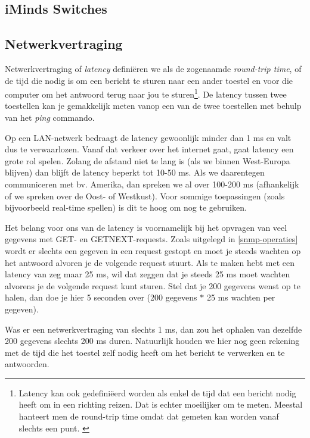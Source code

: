 \subsection{iMinds Switches}



\subsection{Netwerkvertraging}
\label{latency}

Netwerkvertraging of \textit{latency} definiëren we als de zogenaamde \textit{round-trip time},
of de tijd die nodig is om een bericht te sturen naar een ander toestel en voor die computer om het antwoord terug naar jou te sturen\footnote{
	Latency kan ook gedefiniëerd worden als enkel de tijd dat een bericht nodig heeft om in een richting reizen.
	Dat is echter moeilijker om te meten. Meestal hanteert men de round-trip time omdat dat gemeten kan worden vanaf slechts een punt. \cite{latency-wiki}
}.
De latency tussen twee toestellen kan je gemakkelijk meten vanop een van de twee toestellen met behulp van het \textit{ping} commando.

Op een LAN-netwerk bedraagt de latency gewoonlijk minder dan 1 ms en valt dus te verwaarlozen.
Vanaf dat verkeer over het internet gaat, gaat latency een grote rol spelen.
Zolang de afstand niet te lang is (als we binnen West-Europa blijven) dan blijft de latency beperkt tot 10-50 ms.
Als we daarentegen communiceren met bv. Amerika, dan spreken we al over 100-200 ms (afhankelijk of we spreken over de Oost- of Westkust).
Voor sommige toepassingen (zoals bijvoorbeeld real-time spellen) is dit te hoog om nog te gebruiken.

Het belang voor ons van de latency is voornamelijk bij het opvragen van veel gegevens met GET- en GETNEXT-requests.
Zoals uitgelegd in \cref{snmp-operaties} wordt er slechts een gegeven in een request gestopt en
moet je steeds wachten op het antwoord alvoren je de volgende request stuurt.
Als te maken hebt met een latency van zeg maar 25 ms, wil dat zeggen dat je steeds 25 ms moet wachten alvorens je de volgende request kunt sturen.
Stel dat je 200 gegevens wenst op te halen, dan doe je hier 5 seconden over (200 gegevens $*$ 25 ms wachten per gegeven).

Was er een netwerkvertraging van slechts 1 ms, dan zou het ophalen van dezelfde 200 gegevens slechts 200 ms duren.
Natuurlijk houden we hier nog geen rekening met de tijd die het toestel zelf nodig heeft om het bericht te verwerken en te antwoorden.

